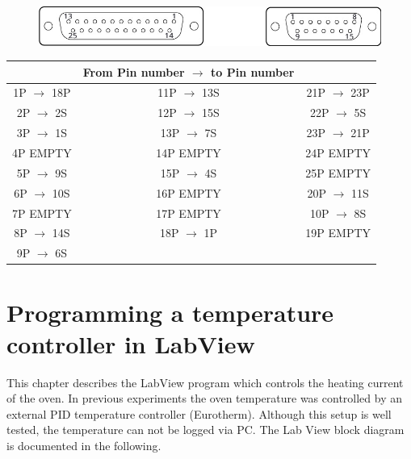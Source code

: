 \documentclass[parskip,12pt,headsepline,a4paper] {scrbook}
\begin{document}
\begin{figure}[ht]
\centerline{
\includegraphics[width=13cm]{./oven/DSub.jpg}}
\end{figure}
\begin{table}[h]
{}
\label{wireing}
\begin{center}
\begin{tabular}{c|c|c}
\multicolumn{1}{c}{} & \multicolumn{1}{c}{From Pin number $\rightarrow$ to Pin number} & \multicolumn{1}{c}{} \\
\hline
\rowcolor{hellgrau}
1P $\rightarrow$ 18P & 11P $\rightarrow$ 13S & 21P $\rightarrow$ 23P \\
\rowcolor{dunkelgrau}
2P $\rightarrow$ 2S & 12P $\rightarrow$ 15S & 22P $\rightarrow$ 5S \\
\rowcolor{hellgrau}
3P $\rightarrow$ 1S & 13P $\rightarrow$ 7S & 23P $\rightarrow$ 21P \\
\rowcolor{dunkelgrau}
4P EMPTY & 14P EMPTY & 24P EMPTY \\
\rowcolor{hellgrau}
5P $\rightarrow$ 9S & 15P $\rightarrow$ 4S & 25P EMPTY \\
\rowcolor{dunkelgrau}
6P $\rightarrow$ 10S & 16P EMPTY & 20P $\rightarrow$ 11S \\
\rowcolor{hellgrau}
7P EMPTY & 17P EMPTY & 10P $\rightarrow$ 8S \\
\rowcolor{dunkelgrau}
8P $\rightarrow$ 14S & 18P $\rightarrow$ 1P & 19P EMPTY \\
\rowcolor{hellgrau}
9P $\rightarrow$ 6S &  &  \\
\end{tabular}
\end{center}
\end{table}


\chapter{Programming a temperature controller in LabView}
\label{chap:tempprogram}
This chapter describes the LabView program which controls the heating current of the oven. In previous experiments the oven temperature was controlled by an external PID temperature controller (Eurotherm). Although this setup is well tested, the temperature can not be logged via PC. The Lab View block diagram is documented in the following.
\end{document}
